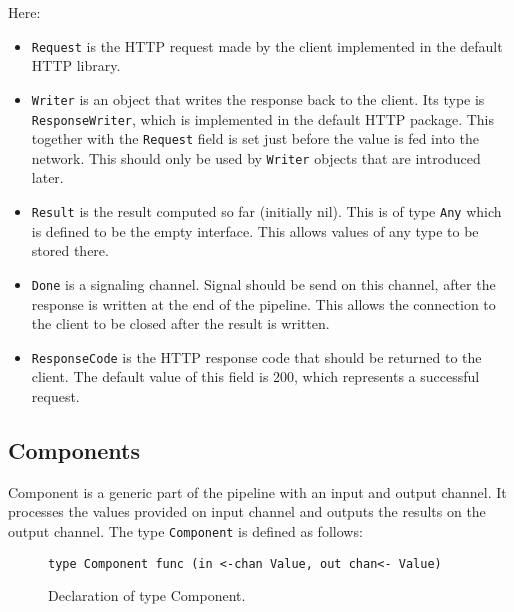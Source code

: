 \documentclass[12pt,a4paper]{article}
\begin{document}
Here:
\begin{itemize}
  \item \texttt{Request} is the HTTP request made by the client implemented
        in the default HTTP library.

  \item \texttt{Writer} is an object that writes the response back to the client.
        Its type is \texttt{ResponseWriter}, which is implemented in the default HTTP
        package. This together with the \texttt{Request} field is set just before
        the value is fed into the network.
        This should only be used by \texttt{Writer} objects that are introduced later.


  \item \texttt{Result} is the result computed so far (initially nil). This is
        of type \texttt{Any} which is defined to be the empty interface.
        This allows values of any type to be stored there.

  \item \texttt{Done} is a signaling channel. Signal should be send on this channel,
		after the response is written at the end of the pipeline. This
        allows the connection to the client to be closed after the result
        is written.

  \item \texttt{ResponseCode} is the HTTP response code that should be 
        returned to the client. The default value of this field is 200,
        which represents a successful request.
\end{itemize}


\subsection{Components}
Component is a generic part of the pipeline with an input and output channel.
It processes the values provided on input channel and outputs the results
on the output channel. The type \texttt{Component} is defined as follows:


\begin{figure}[h]
\centering
\begin{lstlisting}
type Component func (in <-chan Value, out chan<- Value)
\end{lstlisting}
\caption[scale=1.0]{Declaration of type Component.}
\label{fig:Component}
\end{figure}
\end{document}

